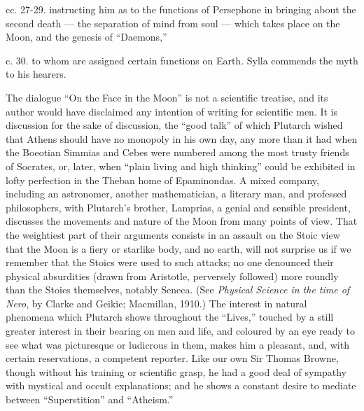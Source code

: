 \documentclass[a4paper, 11pt, oneside, polutonikogreek, english]{article}
\begin{document}
cc. 27-29. instructing him as to the functions of Persephone in bringing about the second death --- the separation of mind from soul --- which takes place on the Moon, and the genesis of ``Daemons,''

c. 30. to whom are assigned certain functions on Earth. Sylla commends the myth to his hearers.

\bigskip
\centerline{\EightStarTaper}
\centerline{\EightStarTaper\EightStarTaper}
\bigskip

The dialogue ``On the Face in the Moon'' is not a scientific treatise, and its author would have disclaimed any intention of writing for scientific men. It is discussion for the sake of discussion, the ``good talk'' of which Plutarch wished that Athens should have no monopoly in his own day, any more than it had when the Boeotian Simmias and Cebes were numbered among the most trusty friends of Socrates, or, later, when ``plain living and high thinking'' could be exhibited in lofty perfection in the Theban home of Epaminondas. A mixed company, including an astronomer, another mathematician, a literary man, and professed philosophers, with Plutarch's brother, Lamprias, a genial and sensible president, discusses the movements and nature of the Moon from many points of view. That the weightiest part of their arguments consists in an assault on the Stoic view that the Moon is a fiery or starlike body, and no earth, will not surprise us if we remember that the Stoics were used to such attacks; no one denounced their physical absurdities (drawn from Aristotle, perversely followed) more roundly than the Stoics themselves, notably Seneca. (See \emph{Physical Science in the time of Nero}, by Clarke and Geikie; Macmillan, 1910.) The interest in natural phenomena which Plutarch shows throughout the ``Lives,'' touched by a still greater interest in their bearing on men and life, and coloured by an eye ready to see what was picturesque or ludicrous in them, makes him a pleasant, and, with certain reservations, a competent reporter. Like our own Sir Thomas Browne, though without his training or scientific grasp, he had a good deal of sympathy with mystical and occult explanations; and he shows a constant desire to mediate between ``Superstition'' and ``Atheism.''
\end{document}
